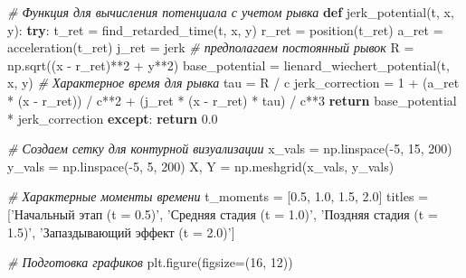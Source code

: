 \documentclass[11pt]{article}
\newenvironment{Shaded}{}{}
\newcommand{\KeywordTok}[1]{\textcolor[rgb]{0.00,0.44,0.13}{\textbf{{#1}}}}
\newcommand{\DecValTok}[1]{\textcolor[rgb]{0.25,0.63,0.44}{{#1}}}
\newcommand{\FloatTok}[1]{\textcolor[rgb]{0.25,0.63,0.44}{{#1}}}
\newcommand{\StringTok}[1]{\textcolor[rgb]{0.25,0.44,0.63}{{#1}}}
\newcommand{\CommentTok}[1]{\textcolor[rgb]{0.38,0.63,0.69}{\textit{{#1}}}}
\newcommand{\NormalTok}[1]{{#1}}
\newcommand{\ControlFlowTok}[1]{\textcolor[rgb]{0.00,0.44,0.13}{\textbf{{#1}}}}
\newcommand{\OperatorTok}[1]{\textcolor[rgb]{0.40,0.40,0.40}{{#1}}}
\begin{document}
\begin{Shaded}
\begin{Highlighting}[]
\CommentTok{# Функция для вычисления потенциала с учетом рывка}
\KeywordTok{def}\NormalTok{ jerk_potential(t, x, y):}
    \ControlFlowTok{try}\NormalTok{:}
\NormalTok{        t_ret }\OperatorTok{=}\NormalTok{ find_retarded_time(t, x, y)}
\NormalTok{        r_ret }\OperatorTok{=}\NormalTok{ position(t_ret)}
\NormalTok{        a_ret }\OperatorTok{=}\NormalTok{ acceleration(t_ret)}
\NormalTok{        j_ret }\OperatorTok{=}\NormalTok{ jerk  }\CommentTok{# предполагаем постоянный рывок}
\NormalTok{        R }\OperatorTok{=}\NormalTok{ np.sqrt((x }\OperatorTok{-}\NormalTok{ r_ret)}\OperatorTok{**}\DecValTok{2} \OperatorTok{+}\NormalTok{ y}\OperatorTok{**}\DecValTok{2}\NormalTok{)}
\NormalTok{        base_potential }\OperatorTok{=}\NormalTok{ lienard_wiechert_potential(t, x, y)}
        \CommentTok{# Характерное время для рывка}
\NormalTok{        tau }\OperatorTok{=}\NormalTok{ R }\OperatorTok{/}\NormalTok{ c}
\NormalTok{        jerk_correction }\OperatorTok{=} \DecValTok{1} \OperatorTok{+}\NormalTok{ (a_ret }\OperatorTok{*}\NormalTok{ (x }\OperatorTok{-}\NormalTok{ r_ret)) }\OperatorTok{/}\NormalTok{ c}\OperatorTok{**}\DecValTok{2} \OperatorTok{+}\NormalTok{ (j_ret }\OperatorTok{*}\NormalTok{ (x }\OperatorTok{-}\NormalTok{ r_ret) }\OperatorTok{*}\NormalTok{ tau) }\OperatorTok{/}\NormalTok{ c}\OperatorTok{**}\DecValTok{3}
        \ControlFlowTok{return}\NormalTok{ base_potential }\OperatorTok{*}\NormalTok{ jerk_correction}
    \ControlFlowTok{except}\NormalTok{:}
        \ControlFlowTok{return} \FloatTok{0.0}

\CommentTok{# Создаем сетку для контурной визуализации}
\NormalTok{x_vals }\OperatorTok{=}\NormalTok{ np.linspace(}\OperatorTok{-}\DecValTok{5}\NormalTok{, }\DecValTok{15}\NormalTok{, }\DecValTok{200}\NormalTok{)}
\NormalTok{y_vals }\OperatorTok{=}\NormalTok{ np.linspace(}\OperatorTok{-}\DecValTok{5}\NormalTok{, }\DecValTok{5}\NormalTok{, }\DecValTok{200}\NormalTok{)}
\NormalTok{X, Y }\OperatorTok{=}\NormalTok{ np.meshgrid(x_vals, y_vals)}

\CommentTok{# Характерные моменты времени}
\NormalTok{t_moments }\OperatorTok{=}\NormalTok{ [}\FloatTok{0.5}\NormalTok{, }\FloatTok{1.0}\NormalTok{, }\FloatTok{1.5}\NormalTok{, }\FloatTok{2.0}\NormalTok{]}
\NormalTok{titles }\OperatorTok{=}\NormalTok{ [}\StringTok{'Начальный этап (t = 0.5)'}\NormalTok{, }
          \StringTok{'Средняя стадия (t = 1.0)'}\NormalTok{, }
          \StringTok{'Поздняя стадия (t = 1.5)'}\NormalTok{, }
          \StringTok{'Запаздывающий эффект (t = 2.0)'}\NormalTok{]}

\CommentTok{# Подготовка графиков}
\NormalTok{plt.figure(figsize}\OperatorTok{=}\NormalTok{(}\DecValTok{16}\NormalTok{, }\DecValTok{12}\NormalTok{))}


\end{Highlighting}
\end{Shaded}
\end{document}

